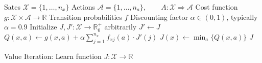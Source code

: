 \documentclass{article}
\begin{document}
\begin{preview}
    \begin{algorithm}[H]
        \begin{algorithmic}
        \Require
        \Statex Sates $\mathcal{X} = \{1, \dots, n_x\}$
        \Statex Actions $\mathcal{A} = \{1, \dots, n_a\},\qquad A: \mathcal{X} \Rightarrow \mathcal{A}$
        \Statex Cost function $g: \mathcal{X} \times \mathcal{A} \rightarrow \mathbb{R}$
        \Statex Transition probabilities $f$
        \Statex Discounting factor $\alpha \in (0, 1)$, typically $\alpha = 0.9$
            \State Initialize $J, J': \mathcal{X} \rightarrow \mathbb{R}_0^+$ arbitrarily
                \State $J' \gets J$
                        \State $Q(x, a) \gets g(x, a) + \alpha \sum_{j=1}^{n_x} f_{xj}(a) \cdot J'(j)$
                    \EndFor
                \EndFor
                    \State $J(x) \gets \min_a \{Q(x, a)\}$
                \EndFor
            \EndWhile
            \Return $J$
        \EndProcedure
        \end{algorithmic}
    \caption{Value Iteration: Learn function $J: \mathcal{X} \rightarrow \mathbb{R}$}
    \label{alg:value-iteration}
    \end{algorithm}
\end{preview}
\end{document}

